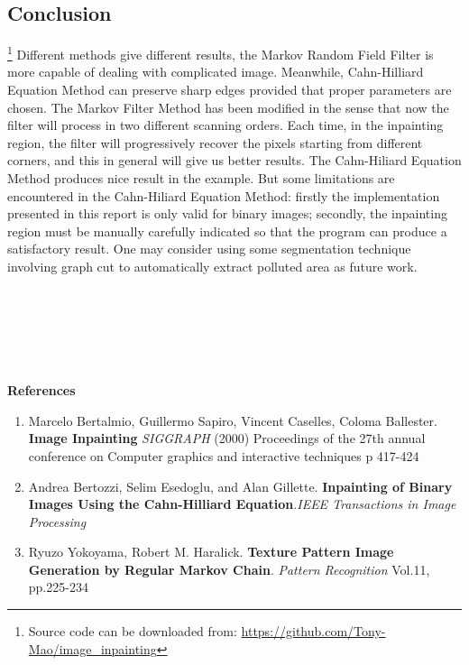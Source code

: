 \documentclass[a4paper]{article}
\begin{document}
\begin{spacing}{1.4}
\section{Conclusion}\footnote{Source code can be downloaded from: \url{https://github.com/Tony-Mao/image_inpainting}}
Different methods give different results, the Markov Random Field Filter is more capable of dealing with complicated image. Meanwhile, Cahn-Hilliard Equation Method can preserve sharp edges provided that proper parameters are chosen. The Markov Filter Method has been modified in the sense that now the filter will process in two different scanning orders. Each time, in the inpainting region, the filter will progressively recover the pixels starting from different corners, and this in general will give us better results. The Cahn-Hiliard Equation Method produces nice result in the example. But some limitations are encountered in the Cahn-Hiliard Equation Method: firstly the implementation presented in this report is only valid for binary images; secondly, the inpainting region must be manually carefully indicated so that the program can produce a satisfactory result. One may consider using some segmentation technique involving graph cut to automatically extract polluted area as future work. \\
~\\
~\\
~\\
~\\
~\\
~\\
\noindent
\Large
\textbf{References}
\normalsize
\begin{enumerate}
\item Marcelo Bertalmio, Guillermo Sapiro, Vincent Caselles, Coloma Ballester. \textbf{Image Inpainting} \emph{SIGGRAPH} (2000) Proceedings of the 27th annual conference on Computer graphics and interactive techniques p 417-424
\item Andrea Bertozzi, Selim Esedoglu, and Alan Gillette. \textbf{Inpainting of Binary Images Using the Cahn-Hilliard Equation}.\emph{IEEE Transactions in Image Processing}
\item Ryuzo Yokoyama, Robert M. Haralick. \textbf{Texture Pattern Image Generation by Regular Markov Chain}. \emph{Pattern Recognition} Vol.11, pp.225-234
\end{enumerate}

\end{spacing}
\end{document}
